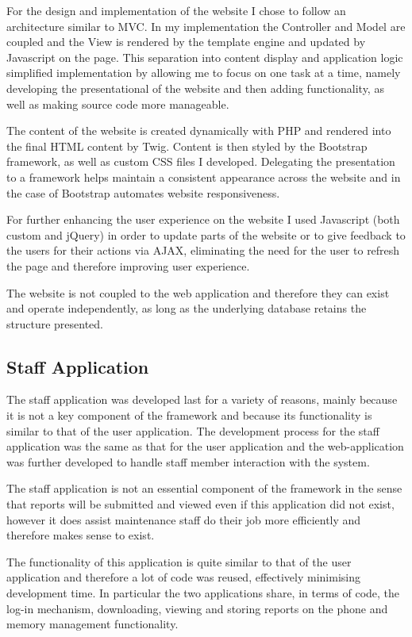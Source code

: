 \documentclass[12pt]{ecsproject}     %
\begin{document}
For the design and implementation of the website I chose to follow an architecture similar to MVC. In my implementation the Controller and Model are coupled and the View is rendered by the template engine and updated by Javascript on the page. This separation into content display and application logic simplified implementation by allowing me to focus on one task at a time, namely developing the presentational of the website and then adding functionality, as well as making source code more manageable.

The content of the website is created dynamically with PHP and rendered into the final HTML content by Twig. Content is then styled by the Bootstrap framework, as well as custom CSS files I developed. Delegating the presentation to a framework helps maintain a consistent appearance across the website and in the case of Bootstrap automates website responsiveness.

For further enhancing the user experience on the website I used Javascript (both custom and jQuery) in order to update parts of the website or to give feedback to the users for their actions via AJAX, eliminating the need for the user to refresh the page and therefore improving user experience. 

The website is not coupled to the web application and therefore they can exist and operate independently, as long as the underlying database retains the structure presented. 

\subsection{Staff Application}
The staff application was developed last for a variety of reasons, mainly because it is not a key component of the framework and because its functionality is similar to that of the user application. The development process for the staff application was the same as that for the user application and the web-application was further developed to handle staff member interaction with the system.

The staff application is not an essential component of the framework in the sense that reports will be submitted and viewed even if this application did not exist, however it does assist maintenance staff do their job more efficiently and therefore makes sense to exist. 

The functionality of this application is quite similar to that of the user application and therefore a lot of code was reused, effectively minimising development time. In particular the two applications share, in terms of code, the log-in mechanism, downloading, viewing and storing reports on the phone and memory management functionality. 
\end{document}
